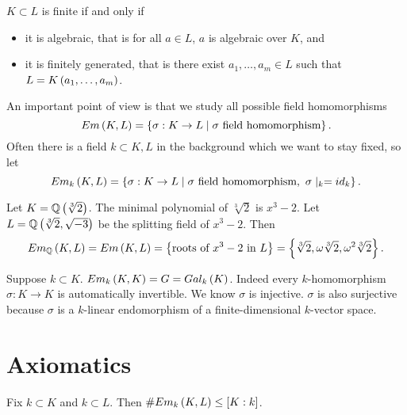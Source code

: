 \begin{remark*}
$ K \subset L $ is finite if and only if
\begin{itemize}
\item it is algebraic, that is for all $ a \in L $, $ a $ is algebraic over $ K $, and
\item it is finitely generated, that is there exist $ a_1, \dots, a_m \in L $ such that $ L = K\left( a_1, \dots, a_m \right) $.
\end{itemize}
\end{remark*}

An important point of view is that we study all possible field homomorphisms
$$ Em\left( K, L \right) = \left\{ \sigma : K \to L \mid \sigma \ \text{field homomorphism} \right\}. $$
Often there is a field $ k \subset K, L $ in the background which we want to stay fixed, so let
$$ Em_k\left( K, L \right) = \left\{ \sigma : K \to L \mid \sigma \ \text{field homomorphism}, \ \sigma \mid_k = id_k \right\}. $$

\begin{example*}
Let $ K = \mathbb{Q}\left( \sqrt[3]{2} \right) $. The minimal polynomial of $ \sqrt[3]{2} $ is $ x^3 - 2 $. Let $ L = \mathbb{Q}\left( \sqrt[3]{2}, \sqrt{-3} \right) $ be the splitting field of $ x^3 - 2 $. Then
$$ Em_{\mathbb{Q}}\left( K, L \right) = Em\left( K, L \right) = \left\{ \text{roots of} \ x^3 - 2 \ \text{in} \ L \right\} = \left\{ \sqrt[3]{2}, \omega\sqrt[3]{2}, \omega^2\sqrt[3]{2} \right\}. $$
\end{example*}

\begin{remark*}
Suppose $ k \subset K $. $ Em_k\left( K, K \right) = G = Gal_k\left( K \right) $. Indeed every $ k $-homomorphism $ \sigma : K \to K $ is automatically invertible. We know $ \sigma $ is injective. $ \sigma $ is also surjective because $ \sigma $ is a $ k $-linear endomorphism of a finite-dimensional $ k $-vector space.
\end{remark*}

\section{Axiomatics}

\begin{proposition}
\label{prop:1}
Fix $ k \subset K $ and $ k \subset L $. Then $ \#Em_k\left( K, L \right) \le \left[ K : k \right] $.
\end{proposition}

